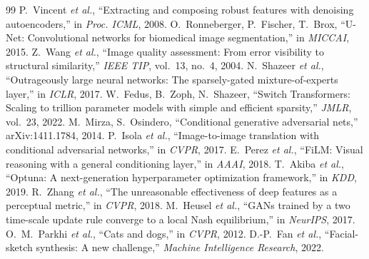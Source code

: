 \documentclass[conference]{IEEEtran}
\begin{document}
\begin{thebibliography}{99}
 P.~Vincent \emph{et al.}, ``Extracting and composing robust features with denoising autoencoders,'' in \emph{Proc. ICML}, 2008.
 O.~Ronneberger, P.~Fischer, T.~Brox, ``U-Net: Convolutional networks for biomedical image segmentation,'' in \emph{MICCAI}, 2015.
 Z.~Wang \emph{et al.}, ``Image quality assessment: From error visibility to structural similarity,'' \emph{IEEE TIP}, vol.~13, no.~4, 2004.
 N.~Shazeer \emph{et al.}, ``Outrageously large neural networks: The sparsely-gated mixture-of-experts layer,'' in \emph{ICLR}, 2017.
 W.~Fedus, B.~Zoph, N.~Shazeer, ``Switch Transformers: Scaling to trillion parameter models with simple and efficient sparsity,'' \emph{JMLR}, vol.~23, 2022.
 M.~Mirza, S.~Osindero, ``Conditional generative adversarial nets,'' arXiv:1411.1784, 2014.
 P.~Isola \emph{et al.}, ``Image-to-image translation with conditional adversarial networks,'' in \emph{CVPR}, 2017.
 E.~Perez \emph{et al.}, ``FiLM: Visual reasoning with a general conditioning layer,'' in \emph{AAAI}, 2018.
 T.~Akiba \emph{et al.}, ``Optuna: A next-generation hyperparameter optimization framework,'' in \emph{KDD}, 2019.
 R.~Zhang \emph{et al.}, ``The unreasonable effectiveness of deep features as a perceptual metric,'' in \emph{CVPR}, 2018.
 M.~Heusel \emph{et al.}, ``GANs trained by a two time-scale update rule converge to a local Nash equilibrium,'' in \emph{NeurIPS}, 2017.
 O.~M.~Parkhi \emph{et al.}, ``Cats and dogs,'' in \emph{CVPR}, 2012.
 D.-P.~Fan \emph{et al.}, ``Facial-sketch synthesis: A new challenge,'' \emph{Machine Intelligence Research}, 2022.
\end{thebibliography}
\end{document}
